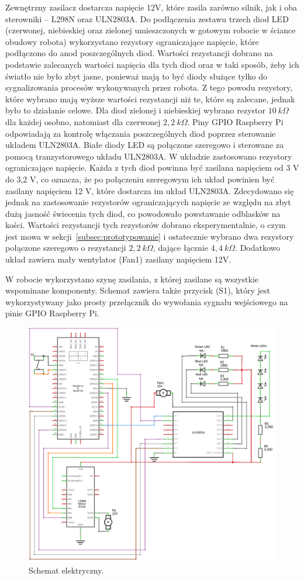Zewnętrzny zasilacz dostarcza napięcie 12V, które zasila zarówno silnik, jak i oba sterowniki -- L298N oraz ULN2803A.
Do podłączenia zestawu trzech diod LED (czerwonej, niebieskiej oraz zielonej umieszczonych w gotowym robocie w ściance obudowy robota) wykorzystano rezystory ograniczające napięcie, które podłączono 
do anod poszczególnych diod. Wartości rezystancji dobrano na podstawie zalecanych wartości napięcia dla tych diod oraz w taki sposób, żeby ich światło nie było zbyt jasne, ponieważ 
mają to być diody służące tylko do sygnalizowania procesów wykonywanych przez robota. Z tego powodu rezystory, które wybrano mają wyższe wartości rezystancji niż te, które są zalecane, jednak było to
działanie celowe. Dla diod zielonej i niebieskiej wybrano rezystor $10~k\Omega$ dla każdej osobno, natomiast dla czerwonej $2{,}2~k\Omega$. Piny GPIO Raspberry Pi odpowiadają za kontrolę włączania poszczególnych diod poprzez sterowanie układem ULN2803A.
Białe diody LED są połączone szeregowo i sterowane za pomocą tranzystorowego układu ULN2803A. W układzie zastosowano rezystory ograniczające napięcie. Każda z tych diod powinna być 
zasilana napięciem od 3 V do 3,2 V, co oznacza, że po połączeniu szeregowym ich układ powinien być zasilany napięciem 12 V, które dostarcza im układ ULN2803A. Zdecydowano się jednak na zastosowanie
rezystorów ograniczających napięcie ze względu na zbyt dużą jasność świecenia tych diod, co powodowało powstawanie odblasków na kości. Wartości rezystancji tych rezystorów dobrano eksperymentalnie, o czym jest mowa w sekcji~\ref{subsec:prototypowanie}
i ostatecznie wybrano dwa rezystory połączone szeregowo o rezystancji $2{,}2~k\Omega$, dające łącznie $4{,}4~k\Omega$.
Dodatkowo układ zawiera mały wentylator (Fan1) zasilany napięciem 12V. 

W robocie wykorzystano szynę zasilania, z której zasilane są wszystkie wspominane komponenty. 
Schemat zawiera także przycisk (S1), który jest wykorzystywany jako prosty przełącznik do wywołania sygnału wejściowego na pinie GPIO Raspberry Pi.

\begin{figure}[H]
    \centering
    \includegraphics[width=0.95\linewidth]{chapters/03-praca-wlasna/figures/electronics circut_schem_fan.png}
    \caption{\label{fig:electronics}Schemat elektryczny.}
\end{figure}